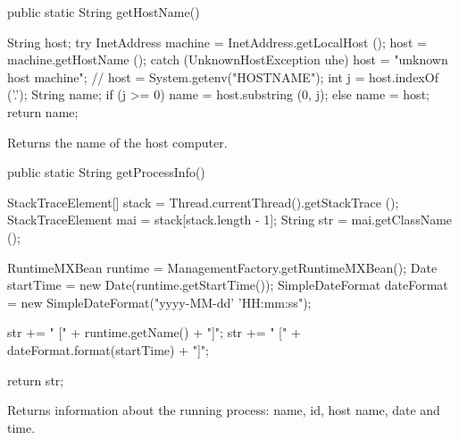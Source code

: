 \begin{code}

   public static String getHostName()\begin{hide} {
      String host;
      try {
         InetAddress machine = InetAddress.getLocalHost ();
         host = machine.getHostName ();
      } catch (UnknownHostException uhe) {
         host = "unknown host machine";
      }
      // host = System.getenv("HOSTNAME");
      int j = host.indexOf ('.');
      String name;
      if (j >= 0)
         name = host.substring (0, j);
      else
         name = host;
      return name;
   }\end{hide}
\end{code}
\begin{tabb} Returns the name of the host computer.
\end{tabb}
\begin{htmlonly}
\end{htmlonly}
\begin{code}

   public static String getProcessInfo()\begin{hide} {
      StackTraceElement[] stack = Thread.currentThread().getStackTrace ();
      StackTraceElement mai = stack[stack.length - 1];
      String str = mai.getClassName ();

      RuntimeMXBean runtime = ManagementFactory.getRuntimeMXBean();
      Date startTime = new Date(runtime.getStartTime());
      SimpleDateFormat dateFormat =
           new SimpleDateFormat("yyyy-MM-dd' 'HH:mm:ss");

      str += " [" + runtime.getName() + "]";
      str += " [" + dateFormat.format(startTime) + "]";

      return str;
   }\end{hide}
\end{code}
\begin{tabb} Returns information about the running process: name, id,
host name, date and time.
\end{tabb}
\begin{htmlonly}
\end{htmlonly}

\begin{code}\begin{hide}
}\end{hide}
\end{code}
